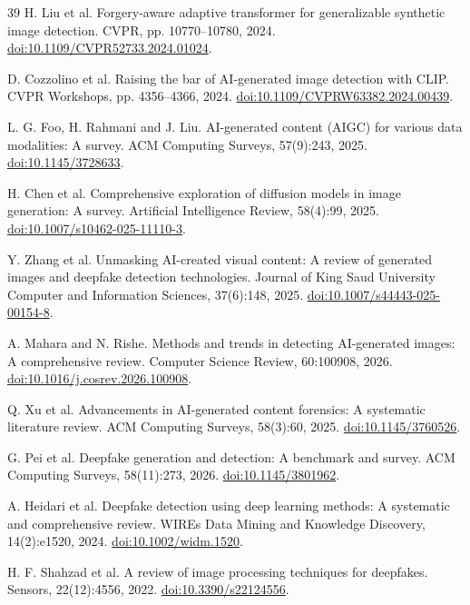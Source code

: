 \documentclass[11pt,a4paper]{article}
\begin{document}
\begin{thebibliography}{39}
 H. Liu et al. Forgery-aware adaptive transformer for generalizable synthetic image detection. CVPR, pp. 10770--10780, 2024. \href{https://doi.org/10.1109/CVPR52733.2024.01024}{doi:10.1109/CVPR52733.2024.01024}.

 D. Cozzolino et al. Raising the bar of AI-generated image detection with CLIP. CVPR Workshops, pp. 4356--4366, 2024. \href{https://doi.org/10.1109/CVPRW63382.2024.00439}{doi:10.1109/CVPRW63382.2024.00439}.

 L. G. Foo, H. Rahmani and J. Liu. AI-generated content (AIGC) for various data modalities: A survey. ACM Computing Surveys, 57(9):243, 2025. \href{https://doi.org/10.1145/3728633}{doi:10.1145/3728633}.

 H. Chen et al. Comprehensive exploration of diffusion models in image generation: A survey. Artificial Intelligence Review, 58(4):99, 2025. \href{https://doi.org/10.1007/s10462-025-11110-3}{doi:10.1007/s10462-025-11110-3}.

 Y. Zhang et al. Unmasking AI-created visual content: A review of generated images and deepfake detection technologies. Journal of King Saud University Computer and Information Sciences, 37(6):148, 2025. \href{https://doi.org/10.1007/s44443-025-00154-8}{doi:10.1007/s44443-025-00154-8}.

 A. Mahara and N. Rishe. Methods and trends in detecting AI-generated images: A comprehensive review. Computer Science Review, 60:100908, 2026. \href{https://doi.org/10.1016/j.cosrev.2026.100908}{doi:10.1016/j.cosrev.2026.100908}.

 Q. Xu et al. Advancements in AI-generated content forensics: A systematic literature review. ACM Computing Surveys, 58(3):60, 2025. \href{https://doi.org/10.1145/3760526}{doi:10.1145/3760526}.

 G. Pei et al. Deepfake generation and detection: A benchmark and survey. ACM Computing Surveys, 58(11):273, 2026. \href{https://doi.org/10.1145/3801962}{doi:10.1145/3801962}.

 A. Heidari et al. Deepfake detection using deep learning methods: A systematic and comprehensive review. WIREs Data Mining and Knowledge Discovery, 14(2):e1520, 2024. \href{https://doi.org/10.1002/widm.1520}{doi:10.1002/widm.1520}.

 H. F. Shahzad et al. A review of image processing techniques for deepfakes. Sensors, 22(12):4556, 2022. \href{https://doi.org/10.3390/s22124556}{doi:10.3390/s22124556}.


\end{thebibliography}
\end{document}

